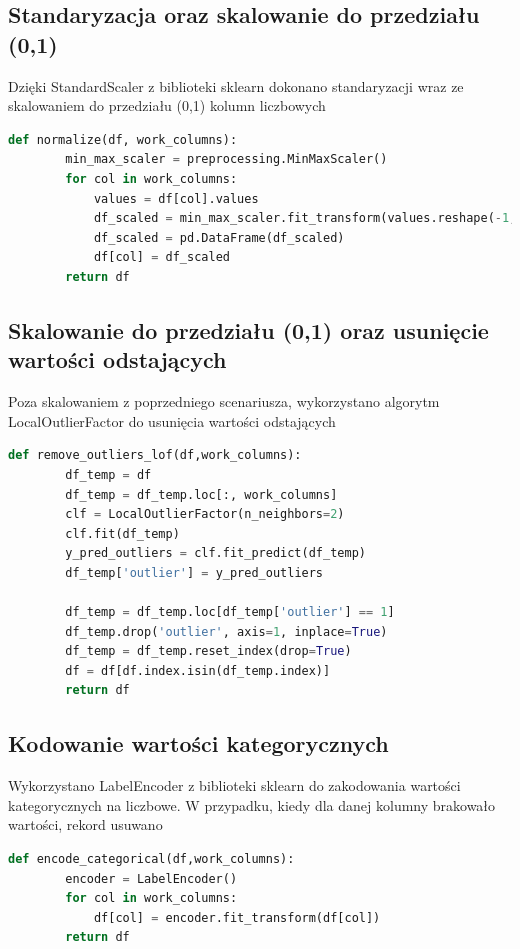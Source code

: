\documentclass{article}
\begin{document}
\subsection{Standaryzacja oraz skalowanie do przedziału (0,1)}
Dzięki StandardScaler z biblioteki sklearn dokonano 
standaryzacji wraz ze skalowaniem do przedziału (0,1) 
kolumn liczbowych

\begin{lstlisting}[language=Python, caption={Skalowanie do przedziału (0,1)}, captionpos=b]
    def normalize(df, work_columns):
        min_max_scaler = preprocessing.MinMaxScaler()
        for col in work_columns:
            values = df[col].values
            df_scaled = min_max_scaler.fit_transform(values.reshape(-1, 1)) 
            df_scaled = pd.DataFrame(df_scaled)
            df[col] = df_scaled
        return df
\end{lstlisting}

\subsection{Skalowanie do przedziału (0,1) oraz usunięcie wartości odstających}
Poza skalowaniem z poprzedniego scenariusza, 
wykorzystano algorytm LocalOutlierFactor do usunięcia 
wartości odstających

\begin{lstlisting}[language=Python, caption={Usuwanie wartości odstających}, captionpos=b]
    def remove_outliers_lof(df,work_columns):
        df_temp = df
        df_temp = df_temp.loc[:, work_columns]
        clf = LocalOutlierFactor(n_neighbors=2)
        clf.fit(df_temp)
        y_pred_outliers = clf.fit_predict(df_temp)
        df_temp['outlier'] = y_pred_outliers

        df_temp = df_temp.loc[df_temp['outlier'] == 1]
        df_temp.drop('outlier', axis=1, inplace=True)
        df_temp = df_temp.reset_index(drop=True)
        df = df[df.index.isin(df_temp.index)]
        return df
\end{lstlisting}

\subsection{Kodowanie wartości kategorycznych}
Wykorzystano LabelEncoder z biblioteki sklearn do 
zakodowania wartości kategorycznych na liczbowe. 
W przypadku, kiedy dla danej kolumny brakowało wartości, 
rekord usuwano

\begin{lstlisting}[language=Python, caption={Usuwanie wartości odstających}, captionpos=b]
    def encode_categorical(df,work_columns):
        encoder = LabelEncoder()
        for col in work_columns:
            df[col] = encoder.fit_transform(df[col])
        return df
\end{lstlisting}
\end{document}
